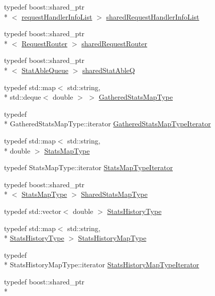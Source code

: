 \begin{DoxyCompactItemize}
typedef boost\-::shared\-\_\-ptr\\*
$<$ \hyperlink{a00089_a403fe12b3fa48680ec27f8af4286383b}{request\-Handler\-Info\-List} $>$ \hyperlink{a00089_aa107348bd263ff2c9358b497155d37b8}{shared\-Request\-Handler\-Info\-List}
\item 
typedef boost\-::shared\-\_\-ptr\\*
$<$ \hyperlink{a00038}{Request\-Router} $>$ \hyperlink{a00089_a203bb476deb3940ecd3f21668dd3cdff}{shared\-Request\-Router}
\item 
typedef boost\-::shared\-\_\-ptr\\*
$<$ \hyperlink{a00041}{Stat\-Able\-Queue} $>$ \hyperlink{a00089_a141592ccd82280d2692ca3b9b490faab}{shared\-Stat\-Able\-Q}
\item 
typedef std\-::map$<$ std\-::string, \\*
std\-::deque$<$ double $>$ $>$ \hyperlink{a00089_a4c76f7ad5a35f6bd51154a961f9c0d7d}{Gathered\-Stats\-Map\-Type}
\item 
typedef \\*
Gathered\-Stats\-Map\-Type\-::iterator \hyperlink{a00089_a53ec1a09258369be8737e6ec2f93961c}{Gathered\-Stats\-Map\-Type\-Iterator}
\item 
typedef std\-::map$<$ std\-::string, \\*
double $>$ \hyperlink{a00089_adb9e851c391ea02ff8f961f1cd37ed8c}{Stats\-Map\-Type}
\item 
typedef Stats\-Map\-Type\-::iterator \hyperlink{a00089_a674afcb960d0097e39ef66ab83af14be}{Stats\-Map\-Type\-Iterator}
\item 
typedef boost\-::shared\-\_\-ptr\\*
$<$ \hyperlink{a00089_adb9e851c391ea02ff8f961f1cd37ed8c}{Stats\-Map\-Type} $>$ \hyperlink{a00089_aec223e8bce5f3988c62ceb0ccad11a68}{Shared\-Stats\-Map\-Type}
\item 
typedef std\-::vector$<$ double $>$ \hyperlink{a00089_a4629097b5a6697a8a1eefd9ac5b0a2b6}{Stats\-History\-Type}
\item 
typedef std\-::map$<$ std\-::string, \\*
\hyperlink{a00089_a4629097b5a6697a8a1eefd9ac5b0a2b6}{Stats\-History\-Type} $>$ \hyperlink{a00089_a8dbb864ea5d1e1fae0d3a1435bd295e7}{Stats\-History\-Map\-Type}
\item 
typedef \\*
Stats\-History\-Map\-Type\-::iterator \hyperlink{a00089_ae45d7146f3abe3c95364c6ea280f7487}{Stats\-History\-Map\-Type\-Iterator}
\item 
typedef boost\-::shared\-\_\-ptr\\*

\end{DoxyCompactItemize}
